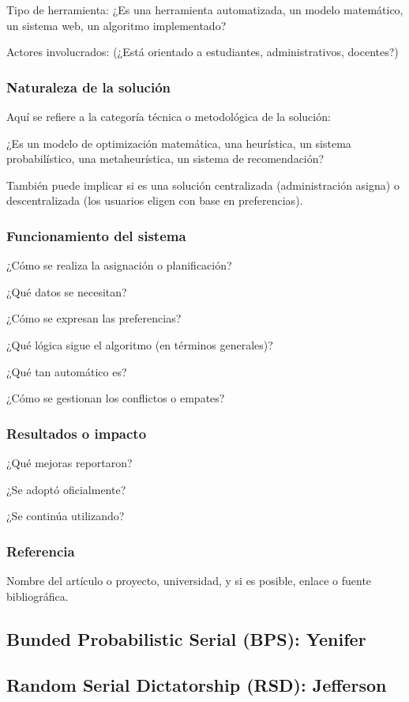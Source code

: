 \documentclass{article}
\begin{document}
Tipo de herramienta: ¿Es una herramienta automatizada, un modelo matemático, un sistema web, un algoritmo implementado?

Actores involucrados: (¿Está orientado a estudiantes, administrativos, docentes?)

\subsubsection{Naturaleza de la solución}
Aquí se refiere a la categoría técnica o metodológica de la solución:

¿Es un modelo de optimización matemática, una heurística, un sistema probabilístico, una metaheurística, un sistema de recomendación?

También puede implicar si es una solución centralizada (administración asigna) o descentralizada (los usuarios eligen con base en preferencias).

\subsubsection{Funcionamiento del sistema}
¿Cómo se realiza la asignación o planificación?

¿Qué datos se necesitan?

¿Cómo se expresan las preferencias?

¿Qué lógica sigue el algoritmo (en términos generales)?

¿Qué tan automático es?

¿Cómo se gestionan los conflictos o empates?

\subsubsection{Resultados o impacto}
¿Qué mejoras reportaron?

¿Se adoptó oficialmente?

¿Se continúa utilizando?

\subsubsection{Referencia}
Nombre del artículo o proyecto, universidad, y si es posible, enlace o fuente bibliográfica.

\subsection{Bunded Probabilistic Serial (BPS): Yenifer}
\subsection{Random Serial Dictatorship (RSD): Jefferson}
\end{document}

